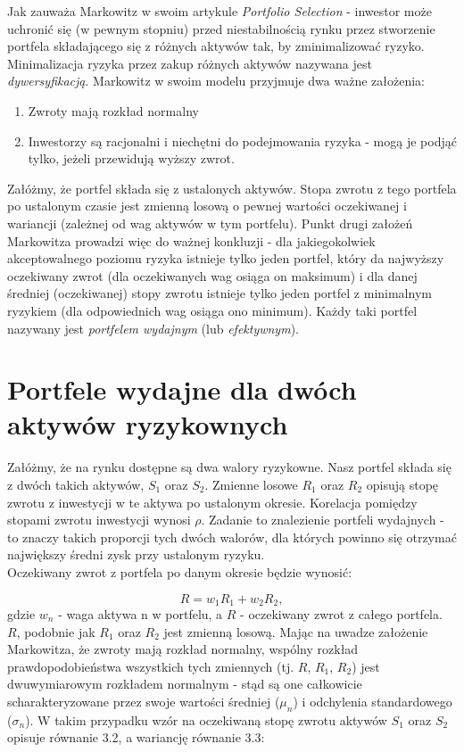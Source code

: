 \documentclass[magister]{dyplom}
\begin{document}
Jak zauważa Markowitz w swoim artykule \textit{Portfolio Selection} - inwestor może uchronić się (w pewnym stopniu) przed niestabilnością rynku przez stworzenie portfela składającego się z różnych aktywów tak, by zminimalizować ryzyko\cite{markowitz}. Minimalizacja ryzyka przez zakup różnych aktywów nazywana jest \textit{dywersyfikacją}. Markowitz w swoim modelu przyjmuje dwa ważne założenia: 

\begin{enumerate}
	\item Zwroty mają rozkład normalny
	\item Inwestorzy są racjonalni i niechętni do podejmowania ryzyka - mogą je podjąć tylko, jeżeli przewidują wyższy zwrot.
\end{enumerate}

Załóżmy, że portfel składa się z ustalonych aktywów. Stopa zwrotu z tego portfela po ustalonym czasie jest zmienną losową o pewnej wartości oczekiwanej i wariancji (zależnej od wag aktywów w tym portfelu).
Punkt drugi założeń Markowitza prowadzi więc do ważnej konkluzji - dla jakiegokolwiek akceptowalnego poziomu ryzyka istnieje tylko jeden portfel, który da najwyższy oczekiwany zwrot (dla oczekiwanych wag osiąga on maksimum) i dla danej średniej (oczekiwanej) stopy zwrotu istnieje tylko jeden portfel z minimalnym ryzykiem (dla odpowiednich wag osiąga ono minimum). Każdy taki portfel nazywany jest \textit{portfelem wydajnym} (lub \textit{efektywnym}).\par

\section{Portfele wydajne dla dwóch aktywów ryzykownych} 

Załóżmy, że na rynku dostępne są dwa walory ryzykowne. Nasz portfel składa się z dwóch takich aktywów, $S_1$ oraz $S_2$. Zmienne losowe $R_1$ oraz $R_2$ opisują stopę zwrotu z inwestycji w te aktywa po ustalonym okresie. Korelacja pomiędzy stopami zwrotu inwestycji wynosi $\rho$. Zadanie to znalezienie portfeli wydajnych - to znaczy takich proporcji tych dwóch walorów, dla których powinno się otrzymać największy średni zysk przy ustalonym ryzyku.\\
Oczekiwany zwrot z portfela po danym okresie będzie wynosić:

\begin{equation}
	R = w_1R_1 + w_2R_2,
\end{equation}
gdzie $w_n$ - waga aktywa n w portfelu, a $R$ - oczekiwany zwrot z całego portfela.\\
$R$, podobnie jak $R_1$ oraz $R_2$ jest zmienną losową. Mając na uwadze założenie Markowitza, że zwroty mają rozkład normalny, wspólny rozkład prawdopodobieństwa wszystkich tych zmiennych (tj. $R$, $R_1$, $R_2$) jest dwuwymiarowym rozkładem normalnym - stąd są one całkowicie scharakteryzowane przez swoje wartości średniej ($\mu_n$) i odchylenia standardowego ($\sigma_n$). W takim przypadku wzór na oczekiwaną stopę zwrotu aktywów $S_1$ oraz $S_2$ opisuje równanie 3.2, a wariancję równanie 3.3:
\end{document}
